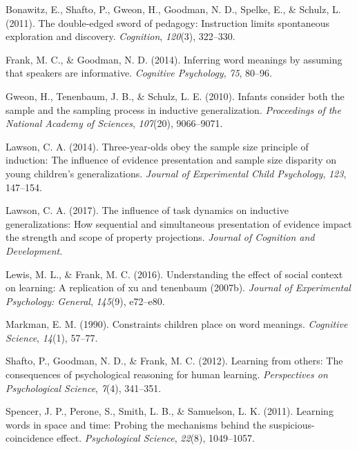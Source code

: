 \documentclass[english,floatsintext,man]{apa6}
\theoremstyle{definition}
\theoremstyle{definition}
\theoremstyle{remark}
\begin{document}
\setlength{\parindent}{-0.5in} \setlength{\leftskip}{0.5in}

\hypertarget{refs}{}
\hypertarget{ref-bonawitz2011}{}
Bonawitz, E., Shafto, P., Gweon, H., Goodman, N. D., Spelke, E., \&
Schulz, L. (2011). The double-edged sword of pedagogy: Instruction
limits spontaneous exploration and discovery. \emph{Cognition},
\emph{120}(3), 322--330.

\hypertarget{ref-frank2014}{}
Frank, M. C., \& Goodman, N. D. (2014). Inferring word meanings by
assuming that speakers are informative. \emph{Cognitive Psychology},
\emph{75}, 80--96.

\hypertarget{ref-gweon2010}{}
Gweon, H., Tenenbaum, J. B., \& Schulz, L. E. (2010). Infants consider
both the sample and the sampling process in inductive generalization.
\emph{Proceedings of the National Academy of Sciences}, \emph{107}(20),
9066--9071.

\hypertarget{ref-lawson2014three}{}
Lawson, C. A. (2014). Three-year-olds obey the sample size principle of
induction: The influence of evidence presentation and sample size
disparity on young children's generalizations. \emph{Journal of
Experimental Child Psychology}, \emph{123}, 147--154.

\hypertarget{ref-lawson2017influence}{}
Lawson, C. A. (2017). The influence of task dynamics on inductive
generalizations: How sequential and simultaneous presentation of
evidence impact the strength and scope of property projections.
\emph{Journal of Cognition and Development}.

\hypertarget{ref-lewis2016understanding}{}
Lewis, M. L., \& Frank, M. C. (2016). Understanding the effect of social
context on learning: A replication of xu and tenenbaum (2007b).
\emph{Journal of Experimental Psychology: General}, \emph{145}(9),
e72--e80.

\hypertarget{ref-markman1990constraints}{}
Markman, E. M. (1990). Constraints children place on word meanings.
\emph{Cognitive Science}, \emph{14}(1), 57--77.

\hypertarget{ref-shafto2012}{}
Shafto, P., Goodman, N. D., \& Frank, M. C. (2012). Learning from
others: The consequences of psychological reasoning for human learning.
\emph{Perspectives on Psychological Science}, \emph{7}(4), 341--351.

\hypertarget{ref-spencer2011learning}{}
Spencer, J. P., Perone, S., Smith, L. B., \& Samuelson, L. K. (2011).
Learning words in space and time: Probing the mechanisms behind the
suspicious-coincidence effect. \emph{Psychological Science},
\emph{22}(8), 1049--1057.
\end{document}
